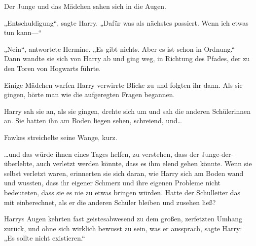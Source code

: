 Der Junge und das Mädchen sahen sich in die Augen.

„Entschuldigung“, sagte Harry. „Dafür was als nächstes passiert. Wenn ich etwas tun kann—“

„Nein“, antwortete Hermine. „Es gibt nichts. Aber es ist schon in Ordnung.“ Dann wandte sie sich von Harry ab und ging weg, in Richtung des Pfades, der zu den Toren von Hogwarts führte.

Einige Mädchen warfen Harry verwirrte Blicke zu und folgten ihr dann. Als sie gingen, hörte man wie die aufgeregten Fragen begannen.

Harry sah sie an, als sie gingen, drehte sich um und sah die anderen Schülerinnen an. Sie hatten ihn am Boden liegen sehen, schreiend, und…

Fawkes streichelte seine Wange, kurz.

…und das würde ihnen eines Tages helfen, zu verstehen, dass der Junge-der-überlebte, auch verletzt werden könnte, dass es ihm elend gehen könnte. Wenn sie selbst verletzt waren, erinnerten sie sich daran, wie Harry sich am Boden wand und wussten, dass ihr eigener Schmerz und ihre eigenen Probleme nicht bedeuteten, dass sie es nie zu etwas bringen würden. Hatte der Schulleiter das mit einberechnet, als er die anderen Schüler bleiben und zusehen ließ?

Harrys Augen kehrten fast geistesabwesend zu dem großen, zerfetzten Umhang zurück, und ohne sich wirklich bewusst zu sein, was er aussprach, sagte Harry: „Es sollte nicht existieren.“

